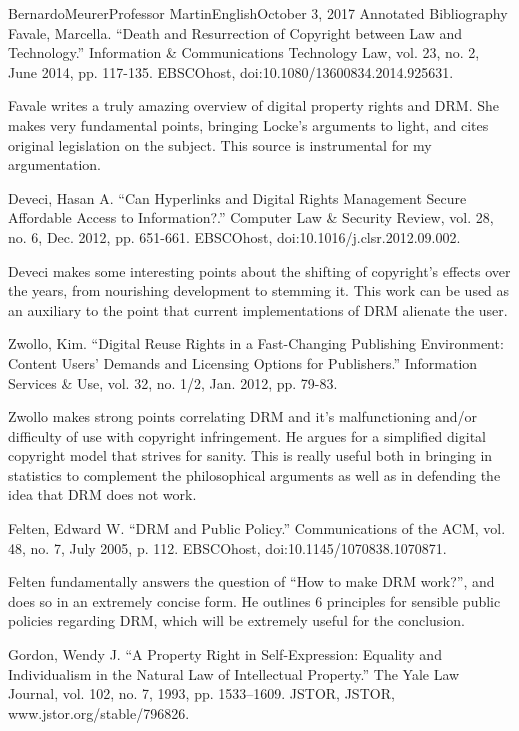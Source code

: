\documentclass[12pt,letterpaper]{article}
\begin{document}
        \begin{mla}{Bernardo}{Meurer}{Professor Martin}{English}{October 3, 2017}%
            {Annotated Bibliography}
            \bibent
            Favale, Marcella. ``Death and Resurrection of Copyright between Law and Technology.'' Information \& Communications Technology Law, vol. 23, no. 2, June 2014, pp. 117-135. EBSCOhost, doi:10.1080/13600834.2014.925631.

            Favale writes a truly amazing overview of digital property rights and DRM. She makes very fundamental points, bringing Locke's arguments to light, and cites original legislation on the subject. This source is instrumental for my argumentation.

            \bibent 
            Deveci, Hasan A. ``Can Hyperlinks and Digital Rights Management Secure Affordable Access to Information?.'' Computer Law \& Security Review, vol. 28, no. 6, Dec. 2012, pp. 651-661. EBSCOhost, doi:10.1016/j.clsr.2012.09.002.

            Deveci makes some interesting points about the shifting of copyright's effects over the years, from nourishing development to stemming it. This work can be used as an auxiliary to the point that current implementations of DRM alienate the user.

            \bibent
            Zwollo, Kim. ``Digital Reuse Rights in a Fast-Changing Publishing Environment: Content Users' Demands and Licensing Options for Publishers.'' Information Services \& Use, vol. 32, no. 1/2, Jan. 2012, pp. 79-83.

            Zwollo makes strong points correlating DRM and it's malfunctioning and/or difficulty of use with copyright infringement. He argues for a simplified digital copyright model that strives for sanity. This is really useful both in bringing in statistics to complement the philosophical arguments as well as in defending the idea that DRM does not work.

            \bibent
            Felten, Edward W. ``DRM and Public Policy.'' Communications of the ACM, vol. 48, no. 7, July 2005, p. 112. EBSCOhost, doi:10.1145/1070838.1070871.

            Felten fundamentally answers the question of ``How to make DRM work?'', and does so in an extremely concise form. He outlines 6 principles for sensible public policies regarding DRM, which will be extremely useful for the conclusion.

            \bibent
            Gordon, Wendy J. ``A Property Right in Self-Expression: Equality and Individualism in the Natural Law of Intellectual Property.'' The Yale Law Journal, vol. 102, no. 7, 1993, pp. 1533–1609. JSTOR, JSTOR, www.jstor.org/stable/796826.


\end{mla}
\end{document}
